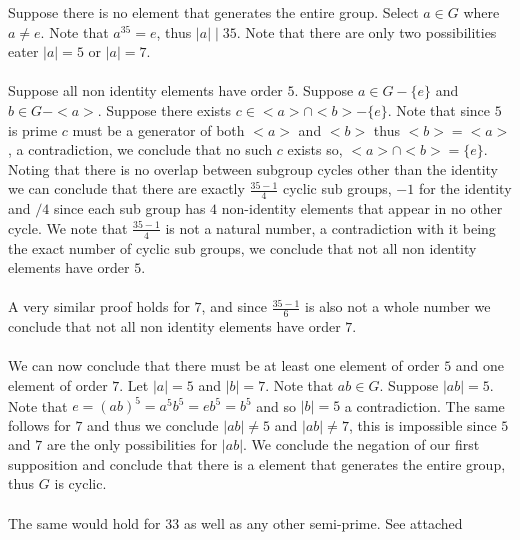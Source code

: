 \documentclass[12pt]{article}
\makeatletter
\theoremstyle{homework}
\newenvironment{exercise}[1]
{\def\@currentlabel{#1}\exercisecore}
{\endexercisecore}
\makeatother
\begin{document}
\begin{exercise}
{4.20}
Suppose there is no element that generates the entire group.  Select $a\in G$ where $a\neq e$.  Note that $a^{35}=e$, thus $|a|\mid 35$.  Note that there are only two possibilities eater $|a|=5$ or $|a|=7$.\\\\
Suppose all non identity elements have order $5$.  Suppose $a\in G-\{e\}$ and $b\in G-<a>$.  Suppose there exists $c\in <a>\cap <b>-\{e\}$.  Note that since $5$ is prime $c$ must be a generator of both $<a>$ and $<b>$ thus $<b> = <a>$, a contradiction, we conclude that no such $c$ exists so, $<a>\cap <b>=\{e\}$.  Noting that there is no overlap between subgroup cycles other than the identity we can conclude that there are exactly $\frac{35-1}{4}$ cyclic sub groups, $-1$ for the identity and $/4$ since each sub group has $4$ non-identity elements that appear in no other cycle.  We note that $\frac{35-1}{4}$ is not a natural number, a contradiction with it being the exact number of cyclic sub groups, we conclude that not all non identity elements have order $5$.\\\\
A very similar proof holds for $7$, and since $\frac{35-1}{6}$ is also not a whole number we conclude that not all non identity elements have order $7$.\\\\
We can now conclude that there must be at least one element of order $5$ and one element of order $7$.  Let $|a|=5$ and $|b|=7$.  Note that $ab\in G$.  Suppose $|ab|=5$.  Note that $e=(ab)^5=a^5b^5=eb^5=b^5$ and so $|b|=5$ a contradiction.  The same follows for $7$ and thus we conclude $|ab|\neq 5$ and $|ab|\neq 7$, this is impossible since $5$ and $7$ are the only possibilities for $|ab|$.  We conclude the negation of our first supposition and conclude that there is a element that generates the entire group, thus $G$ is cyclic.\\\\
The same would hold for $33$ as well as any other semi-prime.
\end{exercise}
\begin{exercise}
{4.33}
See attached
\end{exercise}
\end{document}
